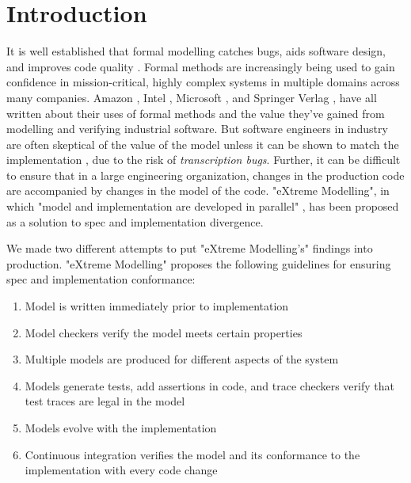 \documentclass{vldb}
\begin{document}
\section{Introduction}
\label{sec:introduction}

It is well established that formal modelling catches bugs, aids software design, and improves code quality \cite{Newcombe2014UseOfFormalMethodsAmazon}.
Formal methods are increasingly being used to gain confidence in mission-critical, highly complex systems in multiple domains across many companies. 
Amazon \cite{Newcombe2014UseOfFormalMethodsAmazon, Chudnov18AmazonS2N, Cook18SecurityAWS}, Intel \cite{Kaivola09IntelI7, Beers08IntelExperience}, Microsoft \cite{Shukla18AzureCosmosDB}, and Springer Verlag \cite{Neubauer12AutomatedContinuousQualityAssurance}, have all written about their uses of formal methods and the value they've gained from modelling and verifying industrial software. 
But software engineers in industry are often skeptical of the value of the model unless it can be shown to match the implementation \cite{Wayne18AgileFormalMethods, Newcombe2014UseOfFormalMethodsAmazon}, due to the risk of \textit{transcription bugs}.
Further, it can be difficult to ensure that in a large engineering organization, changes in the production code are accompanied by changes in the model of the code.
"eXtreme Modelling", in which "model and implementation are developed in parallel" \cite{Gravell11ConcurrentDevelopmentOfModelAndImplementation}, has been proposed as a solution to spec and implementation divergence.

We made two different attempts to put "eXtreme Modelling's" findings into production.
"eXtreme Modelling" proposes the following guidelines for ensuring spec and implementation conformance:
\begin{enumerate}
  \item Model is written immediately prior to implementation
  \item Model checkers verify the model meets certain properties
  \item Multiple models are produced for different aspects of the system
  \item Models generate tests, add assertions in code, and trace checkers verify that test traces are legal in the model
  \item Models evolve with the implementation
  \item Continuous integration verifies the model and its conformance to the implementation with every code change
\end{enumerate}
\end{document}

